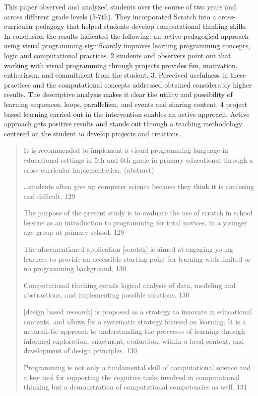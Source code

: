 \documentclass[12pt]{extarticle}
\begin{document}
{This paper observed and analyzed students over the course of two years and across different grade levels (5-7th). They incorporated Scratch into a cross-curricular pedagogy that helped students develop computational thinking skills. In conclusion the results indicated the following: an active pedagogical approach using visual programming significantly improves learning programming concepts, logic and computational practices. 2 students and observers point out that working with visual programming through projects provides fun, motivation, enthusiasm, and commitment from the student. 3. Perceived usefulness in these practices and the computational concepts addressed obtained considerably higher results. The descriptive analysis makes it clear the utility and possibility of learning sequences, loops, parallelism, and events and sharing content. 4 project based learning carried out in the intervention enables an active approach. Active approach gets positive results and stands out through a teaching methodology centered on the student to develop projects and creations.
\begin{quotation}
    
    It is recommended to implement a visual programming language in educational settings in 5th and 6th grade in primary educational through a cross-curricular implementation. (abstract)
    
    …students often give up computer science because they think it is confusing and difficult. 	129
    
    The purpose of the present study is to evaluate the use of scratch in school lessons as an introduction to programming for total novices, in a younger age-group at primary school. 129
    
    The aforementioned application [scratch] is aimed at engaging young learners to provide an accessible starting point for learning with limited or no programming background. 	130
    
    Computational thinking entails logical analysis of data, modeling and abstractions, and implementing possible solutions. 	130
    
    [design based research] is proposed as a strategy to innovate in educational contexts, and allows for a systematic strategy focused on learning. It is a naturalistic approach to understanding the processes of learning through informed exploration, enactment, evaluation, within a local context, and development of design principles. 130
    
    Programming is not only a fundamental skill of computational science and a key tool for supporting the cognitive tasks involved in computational thinking but a demonstration of computational competencies as well.  131
    

\end{quotation}}
\end{document}
